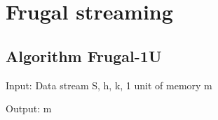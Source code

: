\chapter{\label{frugal-alg}Frugal streaming}


\section*{Algorithm Frugal-1U}

Input: Data stream S, h, k, 1 unit of memory m

Output: m

\iffalse 
1: Initialization m = 0
2: for each s\_{i} in S do
3:   rand = random(0,1); // get a random value in [0,1]
4:   if s_{i} > m and rand > 1 - h/k then
5:      m = m + 1;
6:   else if s\_{i} < m and rand > h/k then
7:      m = m - 1;
8:   end if
9: end for

\fi
